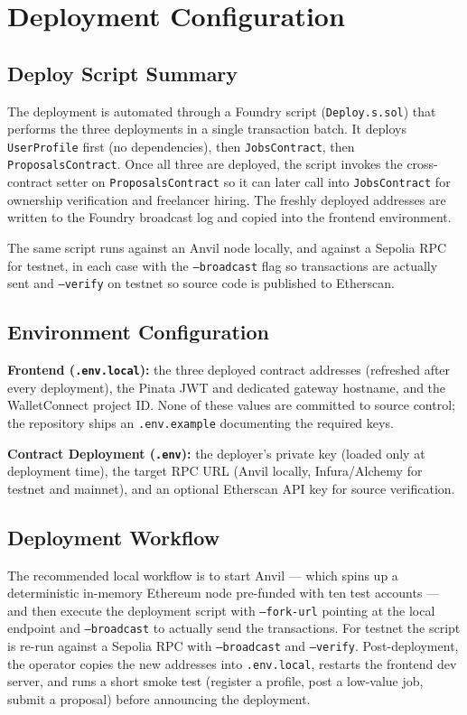 \section{Deployment Configuration}

\subsection{Deploy Script Summary}

The deployment is automated through a Foundry script (\texttt{Deploy.s.sol}) that performs the three deployments in a single transaction batch. It deploys \texttt{UserProfile} first (no dependencies), then \texttt{JobsContract}, then \texttt{ProposalsContract}. Once all three are deployed, the script invokes the cross-contract setter on \texttt{ProposalsContract} so it can later call into \texttt{JobsContract} for ownership verification and freelancer hiring. The freshly deployed addresses are written to the Foundry broadcast log and copied into the frontend environment.

The same script runs against an Anvil node locally, and against a Sepolia RPC for testnet, in each case with the \texttt{--broadcast} flag so transactions are actually sent and \texttt{--verify} on testnet so source code is published to Etherscan.

\subsection{Environment Configuration}

\textbf{Frontend (\texttt{.env.local}):} the three deployed contract addresses (refreshed after every deployment), the Pinata JWT and dedicated gateway hostname, and the WalletConnect project ID. None of these values are committed to source control; the repository ships an \texttt{.env.example} documenting the required keys.

\textbf{Contract Deployment (\texttt{.env}):} the deployer's private key (loaded only at deployment time), the target RPC URL (Anvil locally, Infura/Alchemy for testnet and mainnet), and an optional Etherscan API key for source verification.

\subsection{Deployment Workflow}

The recommended local workflow is to start Anvil --- which spins up a deterministic in-memory Ethereum node pre-funded with ten test accounts --- and then execute the deployment script with \texttt{--fork-url} pointing at the local endpoint and \texttt{--broadcast} to actually send the transactions. For testnet the script is re-run against a Sepolia RPC with \texttt{--broadcast} and \texttt{--verify}. Post-deployment, the operator copies the new addresses into \texttt{.env.local}, restarts the frontend dev server, and runs a short smoke test (register a profile, post a low-value job, submit a proposal) before announcing the deployment.

